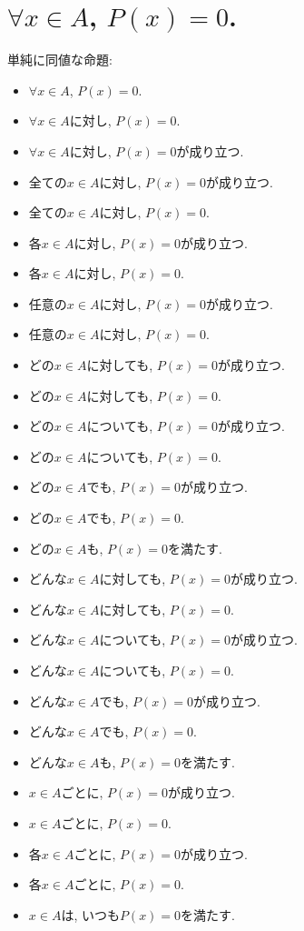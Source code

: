 \documentclass[a4paper,12pt,draft]{amsart}
\newcommand{\PPP}[1]{P(#1)=0}
\begin{document}
\section{$\forall x \in A$, $\PPP{x}$.}
単純に同値な命題:
\begin{itemize}
\item $\forall x \in A$, $\PPP{x}$.
\item $\forall x \in A$に対し, $\PPP{x}$.
\item $\forall x \in A$に対し, $\PPP{x}$が成り立つ.
\item 全ての$x\in A$に対し, $\PPP{x}$が成り立つ.
\item 全ての$x\in A$に対し, $\PPP{x}$.
\item 各$x\in A$に対し, $\PPP{x}$が成り立つ.
\item 各$x\in A$に対し, $\PPP{x}$.
\item 任意の$x\in A$に対し, $\PPP{x}$が成り立つ.
\item 任意の$x\in A$に対し, $\PPP{x}$.
\item どの$x\in A$に対しても, $\PPP{x}$が成り立つ.
\item どの$x\in A$に対しても, $\PPP{x}$.
\item どの$x\in A$についても, $\PPP{x}$が成り立つ.
\item どの$x\in A$についても, $\PPP{x}$.
\item どの$x\in A$でも, $\PPP{x}$が成り立つ.
\item どの$x\in A$でも, $\PPP{x}$.
\item どの$x\in A$も, $\PPP{x}$を満たす.
\item どんな$x\in A$に対しても, $\PPP{x}$が成り立つ.
\item どんな$x\in A$に対しても, $\PPP{x}$.
\item どんな$x\in A$についても, $\PPP{x}$が成り立つ.
\item どんな$x\in A$についても, $\PPP{x}$.
\item どんな$x\in A$でも, $\PPP{x}$が成り立つ.
\item どんな$x\in A$でも, $\PPP{x}$.
\item どんな$x\in A$も, $\PPP{x}$を満たす.
\item $x\in A$ごとに, $\PPP{x}$が成り立つ.
\item $x\in A$ごとに, $\PPP{x}$.
\item 各$x\in A$ごとに, $\PPP{x}$が成り立つ.
\item 各$x\in A$ごとに, $\PPP{x}$.
\item $x\in A$は, いつも$\PPP{x}$を満たす.

\end{itemize}
\end{document}

